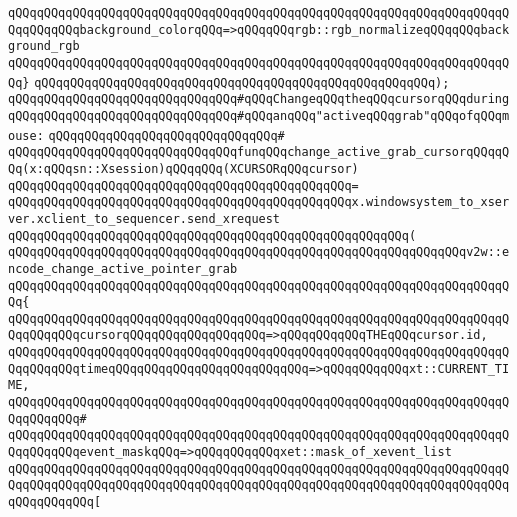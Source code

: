 \verb|qQQqqQQqqQQqqQQqqQQqqQQqqQQqqQQqqQQqqQQqqQQqqQQqqQQqqQQqqQQqqQQqqQQqqQQqqQQqqQQqbackground_colorqQQq=>qQQqqQQqrgb::rgb_normalizeqQQqqQQqbackground_rgb|\newline
\verb|qQQqqQQqqQQqqQQqqQQqqQQqqQQqqQQqqQQqqQQqqQQqqQQqqQQqqQQqqQQqqQQqqQQqqQQq}|\newline
\verb|qQQqqQQqqQQqqQQqqQQqqQQqqQQqqQQqqQQqqQQqqQQqqQQqqQQqqQQq);|\newline
\newline
\verb|qQQqqQQqqQQqqQQqqQQqqQQqqQQqqQQq#qQQqChangeqQQqtheqQQqcursorqQQqduring|\newline
\verb|qQQqqQQqqQQqqQQqqQQqqQQqqQQqqQQq#qQQqanqQQq"activeqQQqgrab"qQQqofqQQqmouse:|\newline
\verb|qQQqqQQqqQQqqQQqqQQqqQQqqQQqqQQq#|\newline
\verb|qQQqqQQqqQQqqQQqqQQqqQQqqQQqqQQqfunqQQqchange_active_grab_cursorqQQqqQQq(x:qQQqsn::Xsession)qQQqqQQq(XCURSORqQQqcursor)|\newline
\verb|qQQqqQQqqQQqqQQqqQQqqQQqqQQqqQQqqQQqqQQqqQQqqQQq=|\newline
\verb|qQQqqQQqqQQqqQQqqQQqqQQqqQQqqQQqqQQqqQQqqQQqqQQqx.windowsystem_to_xserver.xclient_to_sequencer.send_xrequest|\newline
\verb|qQQqqQQqqQQqqQQqqQQqqQQqqQQqqQQqqQQqqQQqqQQqqQQqqQQqqQQq(|\newline
\verb|qQQqqQQqqQQqqQQqqQQqqQQqqQQqqQQqqQQqqQQqqQQqqQQqqQQqqQQqqQQqqQQqv2w::encode_change_active_pointer_grab|\newline
\verb|qQQqqQQqqQQqqQQqqQQqqQQqqQQqqQQqqQQqqQQqqQQqqQQqqQQqqQQqqQQqqQQqqQQqqQQq{|\newline
\verb|qQQqqQQqqQQqqQQqqQQqqQQqqQQqqQQqqQQqqQQqqQQqqQQqqQQqqQQqqQQqqQQqqQQqqQQqqQQqqQQqcursorqQQqqQQqqQQqqQQqqQQq=>qQQqqQQqqQQqTHEqQQqcursor.id,|\newline
\verb|qQQqqQQqqQQqqQQqqQQqqQQqqQQqqQQqqQQqqQQqqQQqqQQqqQQqqQQqqQQqqQQqqQQqqQQqqQQqqQQqtimeqQQqqQQqqQQqqQQqqQQqqQQqqQQq=>qQQqqQQqqQQqxt::CURRENT_TIME,|\newline
\verb|qQQqqQQqqQQqqQQqqQQqqQQqqQQqqQQqqQQqqQQqqQQqqQQqqQQqqQQqqQQqqQQqqQQqqQQqqQQqqQQq#|\newline
\verb|qQQqqQQqqQQqqQQqqQQqqQQqqQQqqQQqqQQqqQQqqQQqqQQqqQQqqQQqqQQqqQQqqQQqqQQqqQQqqQQqevent_maskqQQq=>qQQqqQQqqQQqxet::mask_of_xevent_list|\newline
\verb|qQQqqQQqqQQqqQQqqQQqqQQqqQQqqQQqqQQqqQQqqQQqqQQqqQQqqQQqqQQqqQQqqQQqqQQqqQQqqQQqqQQqqQQqqQQqqQQqqQQqqQQqqQQqqQQqqQQqqQQqqQQqqQQqqQQqqQQqqQQqqQQqqQQqqQQq[|\newline
